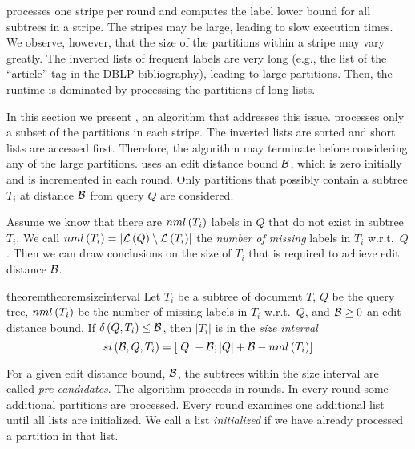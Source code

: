 
\lowerboundmerge{} processes one stripe per round and computes the label lower bound for all subtrees in a stripe. The stripes may be large, leading to slow execution times. We observe, however, that the size of the partitions within a stripe may vary greatly. The  inverted lists of frequent labels are very long (e.g., the list of the ``article'' tag in the DBLP bibliography), leading to large partitions. Then, the runtime is dominated by processing the partitions of long lists.

In this section we present \cone, an algorithm that addresses this issue. \cone{} processes only a subset of the partitions in each stripe.  The inverted lists are sorted and short lists are accessed first. Therefore, the algorithm may terminate before considering any of the large partitions. \cone{} uses an edit distance bound $\mathcal{B}$, which is zero initially and is incremented in each round. Only partitions that possibly contain a subtree $T_i$ at distance $\mathcal{B}$ from query $Q$ are considered.

Assume we know that there are $nml \left( T_i \right)$ labels in $Q$ that do not exist in subtree $T_i$. We call $nml \left( T_i \right) = \left| \mathcal{L} \left( Q \right) \setminus \mathcal{L} \left( T_i \right) \right|$ the \emph{number of missing} labels in $T_i$ w.r.t.\ $Q$. Then we can draw conclusions on the size of $T_i$ that is required to achieve edit distance $\mathcal{B}$.

\begin{restatable}{theorem}{theoremsizeinterval}
\label{th:size-interval}
%
Let $T_i$ be a subtree of document $T$, $Q$ be the query tree, $nml \left( T_i \right)$ be the number of missing labels in $T_i$ w.r.t.\ $Q$, and $\mathcal{B}\geq 0$ an edit distance bound. If $\delta \left( Q, T_i \right)\leq \mathcal{B}$, then $|T_i|$ is in the \emph{size interval}
\begin{equation}
si \left( \mathcal{B}, Q, T_i \right) = \left[ \left| Q \right| - \mathcal{B}; \left| Q \right| + \mathcal{B} - nml \left( T_i \right) \right]
\end{equation}
\end{restatable}

For a given edit distance bound, $\mathcal{B}$, the subtrees within the size interval are called \emph{pre-candidates}. The \cone{} algorithm proceeds in rounds. In every round some additional partitions are processed. Every round examines one additional list until all lists are initialized. We call a list \emph{initialized} if we have already processed a partition in that list.

